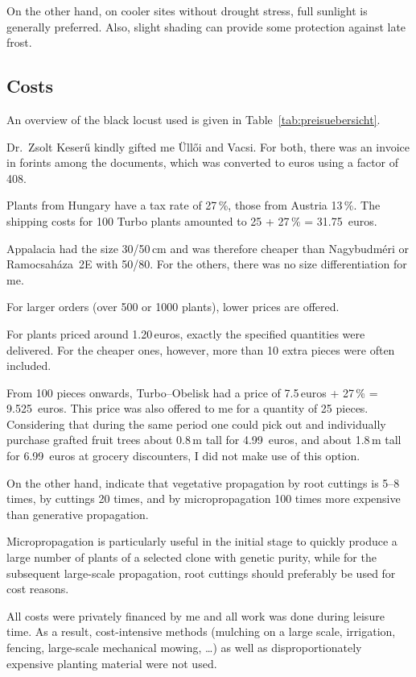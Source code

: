 On the other hand, on cooler sites without drought stress, full sunlight is 
generally preferred. Also, slight shading can provide some protection against 
late frost.

\subsection{Costs}

An overview of the black locust used is given in Table~\ref{tab:preisuebersicht}.


Dr.~Zsolt Keserű kindly gifted me Üllői and Vacsi. For both, there was an invoice in forints among the documents, which was converted to euros using a factor of 408.

Plants from Hungary have a tax rate of 27\,\%, those from Austria 13\,\%. The shipping costs for 100 Turbo plants amounted to 25 + 27\,\% = 31.75~euros.

Appalacia had the size 30/50\,cm and was therefore cheaper than Nagybudméri or Ramocsaháza~2E with 50/80. For the others, there was no size differentiation for me.

For larger orders (over 500 or 1000 plants), lower prices are offered.

For plants priced around 1.20\,euros, exactly the specified quantities were delivered. For the cheaper ones, however, more than 10 extra pieces were often included.

From 100 pieces onwards, Turbo--Obelisk had a price of 7.5\,euros + 27\,\% = 9.525~euros. This price was also offered to me for a quantity of 25 pieces. Considering that during the same period one could pick out and individually purchase grafted fruit trees about 0.8\,m tall for 4.99~euros, and about 1.8\,m tall for 6.99~euros at grocery discounters, I did not make use of this option.

On the other hand, \citet{keresztesi1988robinieLw,redei2005robinieVermehrung} indicate that vegetative propagation by root cuttings is 5--8 times, by cuttings 20 times, and by micropropagation 100 times more expensive than generative propagation.

Micropropagation is particularly useful in the initial stage to quickly produce a large number of plants of a selected clone with genetic purity, while for the subsequent large-scale propagation, root cuttings should preferably be used for cost reasons.

All costs were privately financed by me and all work was done during leisure time. As a result, cost-intensive methods (mulching on a large scale, irrigation, fencing, large-scale mechanical mowing, \dots) as well as disproportionately expensive planting material were not used.

